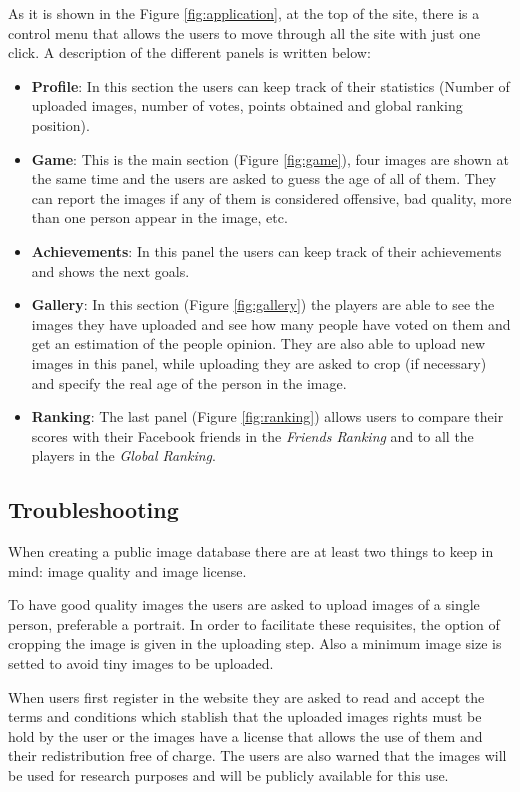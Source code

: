 As it is shown in the Figure \ref{fig:application}, at the top of the site, there is a control menu that allows the users to move through all the site with just one click. A description of the different panels is written below:

\begin{itemize}
	\item \textbf{Profile}: In this section the users can keep track of their statistics (Number of uploaded images, number of votes, points obtained and global ranking position).
	\item \textbf{Game}: This is the main section (Figure \ref{fig:game}), four images are shown at the same time and the users are asked to guess the age of all of them. They can report the images if any of them is considered offensive, bad quality, more than one person appear in the image, etc.
	\item \textbf{Achievements}: In this panel the users can keep track of their achievements and shows the next goals.
	\item \textbf{Gallery}: In this section (Figure \ref{fig:gallery}) the players are able to see the images they have uploaded and see how many people have voted on them and get an estimation of the people opinion. They are also able to upload new images in this panel, while uploading they are asked to crop (if necessary) and specify the real age of the person in the image.
	\item \textbf{Ranking}:	The last panel (Figure \ref{fig:ranking}) allows users to compare their scores with their Facebook friends in the \textit{Friends Ranking} and to all the players in the \textit{Global Ranking}.
\end{itemize}

\subsection{Troubleshooting}\label{sec:trouble}

When creating a public image database there are at least two things to keep in mind: image quality and image license.

To have good quality images the users are asked to upload images of a single person, preferable a portrait. In order to facilitate these requisites, the option of cropping the image is given in the uploading step. Also a minimum image size is setted to avoid tiny images to be uploaded.
 
When users first register in the website they are asked to read and accept the terms and conditions which stablish that the uploaded images rights must be hold by the user or the images have a license that allows the use of them and their redistribution free of charge. The users are also warned that the images will be used for research purposes and will be publicly available for this use. 



